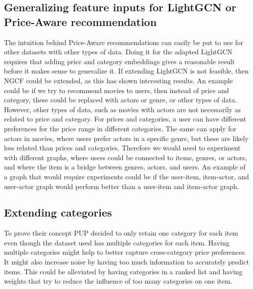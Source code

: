 \subsection{Generalizing feature inputs for LightGCN or Price-Aware recommendation}
The intuition behind Price-Aware recommendations can easily be put to use for other datasets with other types of data.
Doing it for the adapted LightGCN requires that adding price and category embeddings gives a reasonable result before it makes sense to generalize it.
If extending LightGCN is not feasible, then NGCF could be extended, as this has shown interesting results.
An example could be if we try to recommend movies to users, then instead of price and category, these could be replaced with actors or genre, or other types of data.
However, other types of data, such as movies with actors are not necessarily as related to price and category.
For prices and categories, a user can have different preferences for the price range in different categories.
The same can apply for actors in movies, where users prefer actors in a specific genre, but these are likely less related than prices and categories.
Therefore we would need to experiment with different graphs, where users could be connected to items, genres, or actors, and where the item is a bridge between genres, actors, and users.
An example of a graph that would require experiments could be if the user-item, item-actor, and user-actor graph would perform better than a user-item and item-actor graph.

\subsection{Extending categories}
To prove their concept PUP decided to only retain one category for each item even though the dataset used has multiple categories for each item.
Having multiple categories might help to better capture cross-category price preferences.
It might also increase noise by having too much information to accurately predict items.
This could be alleviated by having categories in a ranked list and having weights that try to reduce the influence of too many categories on one item.
